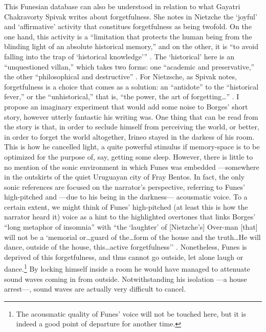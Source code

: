 This Funesian database can also be understood in relation to what Gayatri Chakravorty Spivak \parencite{Der76:Of} writes about forgetfulness. She notes in Nietzche the `joyful' and `affirmative' activity that constitues forgetfulness as being twofold. On the one hand, this activity is a ``limitation that protects the human being from the blinding light of an absolute historical memory,'' and on the other, it is ``to avoid falling into the trap of `historical knowledge''' \parencite[xxxi]{Der76:Of}. The `historical' here is an ``unquestioned villan,'' which takes two forms: one ``academic and preservative,'' the other ``philosophical and destructive'' \parencite[xxxi]{Der76:Of}. For Nietzsche, as Spivak notes, forgetfulness is a choice that comes as a solution: an ``antidote'' to the ``historical fever,'' or the ``unhistorical,'' that is, ``the power, the art of forgetting\dots'' \parencite[xxxi]{Der76:Of}. I propose an imaginary experiment that would add some noise to Borges' short story, however utterly fantastic his writing was. One thing that can be read from the story is that, in order to seclude himself from perceiving the world, or better, in order to forget the world altogether, Irineo stayed in the darkess of his room. This is how he cancelled light, a quite powerful stimulus if memory-space is to be optimized for the purpose of, say, getting some sleep. However, there is little to no mention of the sonic environment in which Funes was embedded ---somewhere in the outskirts of the quiet Uruguayan city of Fray Bentos. In fact, the only sonic references are focused on the narrator's perspective, referring to Funes' high-pitched and ---due to his being in the darkness--- acousmatic voice. To a certain extent, we might think of Funes' high-pitched (at least this is how the narrator heard it) voice as a hint to the highlighted overtones that links Borges' ``long metaphor of insomnia'' with ``the `laughter' of [Nietzche's] Over-man [that] will not be a `memorial or\dots guard of the\dots form of the house and the truth\dots He will dance, outside of the house, this\dots active forgetfulness'' \parencite[xxxii]{Der76:Of}. Nonetheless, Funes is deprived of this forgetfulness, and thus cannot go outside, let alone laugh or dance.\footnote{The acousmatic quality of Funes' voice will not be touched here, but it is indeed a good point of departure for another time.} By locking himself inside a room he would have managed to attenuate sound waves coming in from outside. Notwithstanding his isolation ---a house arrest---, sound waves are actually very difficult to cancel.


